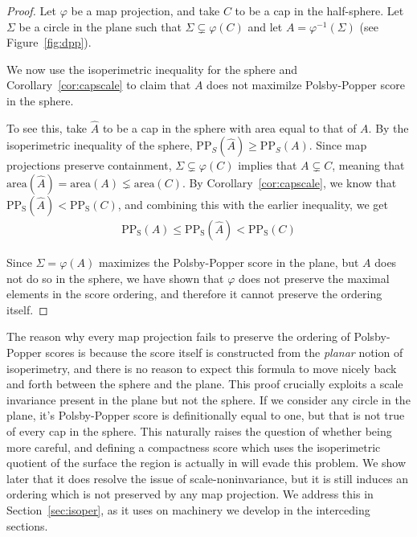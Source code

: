 \begin{proof}
  Let $\varphi$ be a map projection, and take $C$ to be a cap in the
  half-sphere. Let $\Sigma$ be a circle in the plane such that $\Sigma
  \subsetneq \varphi(C)$ and let $A=\varphi^{-1}(\Sigma)$ (see
  Figure~\ref{fig:dpp}).


  We now use the isoperimetric inequality for the sphere 
  and Corollary~\ref{cor:capscale} to claim that 
  $A$ does not maximilze Polsby-Popper score in the sphere.

  To see this, take $\hat{A}$ to be a cap in the sphere with 
  area equal to that of $A$. By the isoperimetric 
  inequality of the sphere, $\mathrm{PP}_S(\hat{A})\geq
  \mathrm{PP}_S(A)$. Since map projections preserve containment,
  $\Sigma\subsetneq \varphi(C)$ implies that $A\subsetneq C$, 
  meaning that $\mathrm{area}(\hat A) = \mathrm{area}(A)\lneq 
  \mathrm{area}(C)$. By Corollary~\ref{cor:capscale}, we know that
  $\mathrm{PP_S}(\hat{A})< \mathrm{PP_S}(C)$, and combining this with
  the earlier inequality, we get
  \begin{align*}
    \mathrm{PP_S}({A})\leq \mathrm{PP_S}(\hat{A})< \mathrm{PP_S}(C)
  \end{align*}


  Since $\Sigma = \varphi(A)$ maximizes the Polsby-Popper score in the
  plane, but $A$ does not do so in the sphere, we have shown that
  $\varphi$ does not preserve the maximal elements in the score
  ordering, and therefore it cannot preserve the ordering itself.
\end{proof}

The reason why every map projection fails to preserve the ordering of
Polsby-Popper scores is because the score itself is constructed from
the \textit{planar} notion of isoperimetry, and there is no reason to
expect this formula to move nicely back and forth between the sphere
and the plane.  This proof crucially exploits a scale invariance
present in the plane but not the sphere.  If we consider any circle in
the plane, it's Polsby-Popper score is definitionally equal to one,
but that is not true of every cap in the sphere.  This naturally
raises the question of whether being more careful, and defining
a compactness score which uses the isoperimetric quotient of the
surface the region is actually in will evade this problem.  We show
later that it does resolve the issue of scale-noninvariance, but it is
still induces an ordering which is not preserved by any map
projection.  We address this in Section~\ref{sec:isoper}, as it uses
on machinery we develop in the interceding sections.
